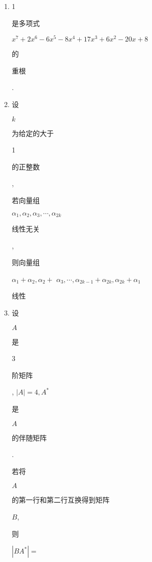 \documentclass[10pt]{article}
\begin{document}
\begin{enumerate}
  \item 1 \begin{CJK}{UTF8}{mj}是多项式\end{CJK} $x^{7}+2 x^{6}-6 x^{5}-8 x^{4}+17 x^{3}+6 x^{2}-20 x+8$ \begin{CJK}{UTF8}{mj}的\end{CJK} \begin{CJK}{UTF8}{mj}重根\end{CJK}.

  \item \begin{CJK}{UTF8}{mj}设\end{CJK} $k$ \begin{CJK}{UTF8}{mj}为给定的大于\end{CJK} 1 \begin{CJK}{UTF8}{mj}的正整数\end{CJK}, \begin{CJK}{UTF8}{mj}若向量组\end{CJK} $\alpha_{1}, \alpha_{2}, \alpha_{3}, \cdots, \alpha_{2 k}$ \begin{CJK}{UTF8}{mj}线性无关\end{CJK}, \begin{CJK}{UTF8}{mj}则向量组\end{CJK} $\alpha_{1}+\alpha_{2}, \alpha_{2}+$ $\alpha_{3}, \cdots, \alpha_{2 k-1}+\alpha_{2 k}, \alpha_{2 k}+\alpha_{1}$ \begin{CJK}{UTF8}{mj}线性\end{CJK}

  \item \begin{CJK}{UTF8}{mj}设\end{CJK} $A$ \begin{CJK}{UTF8}{mj}是\end{CJK} 3 \begin{CJK}{UTF8}{mj}阶矩阵\end{CJK}, $|A|=4, A^{*}$ \begin{CJK}{UTF8}{mj}是\end{CJK} $A$ \begin{CJK}{UTF8}{mj}的伴随矩阵\end{CJK}. \begin{CJK}{UTF8}{mj}若将\end{CJK} $A$ \begin{CJK}{UTF8}{mj}的第一行和第二行互换得到矩阵\end{CJK} $B$, \begin{CJK}{UTF8}{mj}则\end{CJK} $\left|B A^{*}\right|=$


\end{enumerate}
\end{document}
